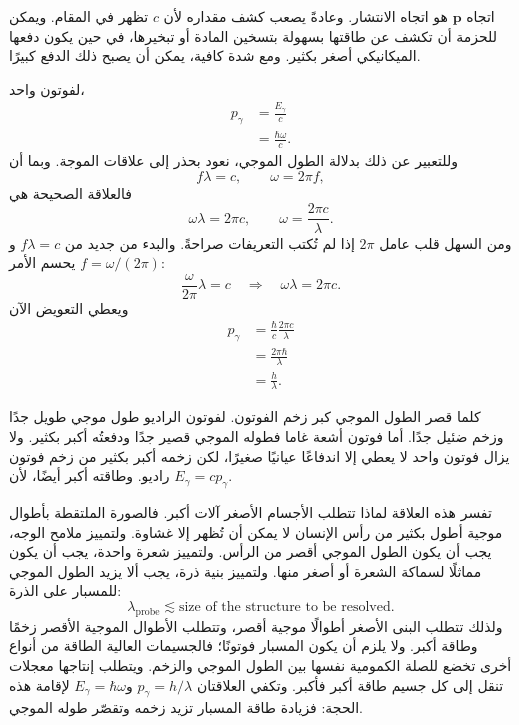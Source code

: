 اتجاه \(\mathbf p\) هو اتجاه الانتشار. وعادةً يصعب كشف مقداره لأن \(c\) تظهر في المقام. ويمكن للحزمة أن تكشف عن طاقتها بسهولة بتسخين المادة أو تبخيرها، في حين يكون دفعها الميكانيكي أصغر بكثير. ومع شدة كافية، يمكن أن يصبح ذلك الدفع كبيرًا.

لفوتون واحد،
\begin{align}
p_\gamma
&=\frac{E_\gamma}{c}\\
&=\frac{\hbar\omega}{c}.
\end{align}
وللتعبير عن ذلك بدلالة الطول الموجي، نعود بحذر إلى علاقات الموجة. وبما أن
\begin{equation}
f\lambda=c,
\qquad
\omega=2\pi f,
\end{equation}
فالعلاقة الصحيحة هي
\begin{equation}
\omega\lambda=2\pi c,
\qquad
\omega=\frac{2\pi c}{\lambda}.
\end{equation}
ومن السهل قلب عامل \(2\pi\) إذا لم تُكتب التعريفات صراحةً. والبدء من جديد من \(f\lambda=c\) و\(f=\omega/(2\pi)\) يحسم الأمر:
\begin{equation}
\frac{\omega}{2\pi}\lambda=c
\quad\Longrightarrow\quad
\omega\lambda=2\pi c.
\end{equation}
ويعطي التعويض الآن
\begin{align}
p_\gamma
&=\frac{\hbar}{c}\frac{2\pi c}{\lambda}\\
&=\frac{2\pi\hbar}{\lambda}\\
&=\frac{h}{\lambda}.
\end{align}

\begin{classroomqa}
\end{classroomqa}

كلما قصر الطول الموجي كبر زخم الفوتون. لفوتون الراديو طول موجي طويل جدًا وزخم ضئيل جدًا. أما فوتون أشعة غاما فطوله الموجي قصير جدًا ودفعتُه أكبر بكثير. ولا يزال فوتون واحد لا يعطي إلا اندفاعًا عيانيًا صغيرًا، لكن زخمه أكبر بكثير من زخم فوتون راديو. وطاقته أكبر أيضًا، لأن \(E_\gamma=cp_\gamma\).

تفسر هذه العلاقة لماذا تتطلب الأجسام الأصغر آلات أكبر. فالصورة الملتقطة بأطوال موجية أطول بكثير من رأس الإنسان لا يمكن أن تُظهر إلا غشاوة. ولتمييز ملامح الوجه، يجب أن يكون الطول الموجي أقصر من الرأس. ولتمييز شعرة واحدة، يجب أن يكون مماثلًا لسماكة الشعرة أو أصغر منها. ولتمييز بنية ذرة، يجب ألا يزيد الطول الموجي للمسبار على الذرة:
\begin{equation}
\lambda_{\mathrm{probe}}\lesssim
\text{size of the structure to be resolved}.
\end{equation}
ولذلك تتطلب البنى الأصغر أطوالًا موجية أقصر، وتتطلب الأطوال الموجية الأقصر زخمًا وطاقة أكبر. ولا يلزم أن يكون المسبار فوتونًا؛ فالجسيمات العالية الطاقة من أنواع أخرى تخضع للصلة الكمومية نفسها بين الطول الموجي والزخم. ويتطلب إنتاجها معجلات تنقل إلى كل جسيم طاقة أكبر فأكبر. وتكفي العلاقتان \(p_\gamma=h/\lambda\) و\(E_\gamma=\hbar\omega\) لإقامة هذه الحجة: فزيادة طاقة المسبار تزيد زخمه وتقصّر طوله الموجي.

